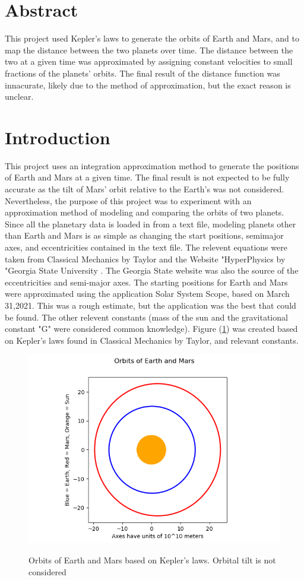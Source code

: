 \section{Abstract}
This project used Kepler's laws to generate the orbits of Earth and Mars, and to map the distance between the two
planets over time. The distance between the two at a given time was approximated by assigning constant velocities to
small fractions of the planets' orbits. The final result of the distance function was innacurate, likely due to the 
method of approximation, but the exact reason is unclear.
\section{Introduction}
This project uses an integration approximation method to generate the positions of Earth and Mars at a given time. 
The final result is not expected to be fully accurate as the tilt of Mars' orbit relative to the Earth's was not 
considered. Nevertheless, the purpose of this project was to experiment with an approximation method of modeling and
comparing the orbits of two planets. Since all the planetary data is loaded in from a text file, modeling planets other than Earth and Mars is as simple as changing the start positions, semimajor axes, and eccentricities contained in the 
text file. 
The relevent equations were taken from Classical Mechanics by Taylor \cite{taylor_classical_2005} and the Website "HyperPhysics by "Georgia State University
\cite{noauthor_Keplers_nodate}. The Georgia State
website was also the source of the eccentricities and semi-major axes. 
The starting positions for Earth and Mars were approximated using the application Solar System Scope, based on March 31,2021\cite{noauthor_solar_nodate}.
This was a rough estimate, but the application was the best that could be found. The other relevent constants (mass of
the sun and the gravitational constant "G" were considered common knowledge).
Figure (\ref{OrbitPlot}) was created
based on Kepler's laws found in Classical Mechanics by Taylor, and relevant constants.
\begin{figure}
	\includegraphics[scale = 0.8]{EllipseTest2.png}
	\label{OrbitPlot}
	\caption{Orbits of Earth and Mars based on Kepler's laws. Orbital tilt is not considered}
\end{figure}
